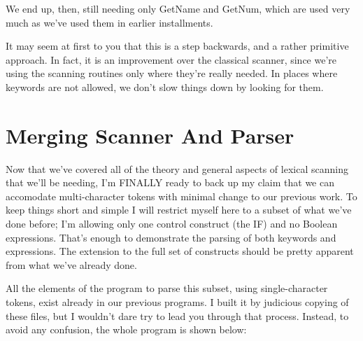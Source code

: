 \documentclass[float=false, crop=false]{standalone}
\begin{document}
We end up, then, still needing only GetName and GetNum, which are used very much
as we've used them in earlier installments.

It may seem at first to you that this is a step backwards, and a rather
primitive approach. In fact, it is an improvement over the classical scanner,
since we're using the scanning routines only where they're really needed. In
places where keywords are not allowed, we don't slow things down by looking for
them.

\section{Merging Scanner And Parser}

Now that we've covered all of the theory and general aspects of lexical scanning
that we'll be needing, I'm FINALLY ready to back up my claim that we can
accomodate multi-character tokens with minimal change to our previous work. To
keep things short and simple I will restrict myself here to a subset of what
we've done before; I'm allowing only one control construct (the IF) and no
Boolean expressions. That's enough to demonstrate the parsing of both keywords
and expressions. The extension to the full set of constructs should be pretty
apparent from what we've already done.

All the elements of the program to parse this subset, using single-character
tokens, exist already in our previous programs. I built it by judicious copying
of these files, but I wouldn't dare try to lead you through that process.
Instead, to avoid any confusion, the whole program is shown below:
\end{document}
